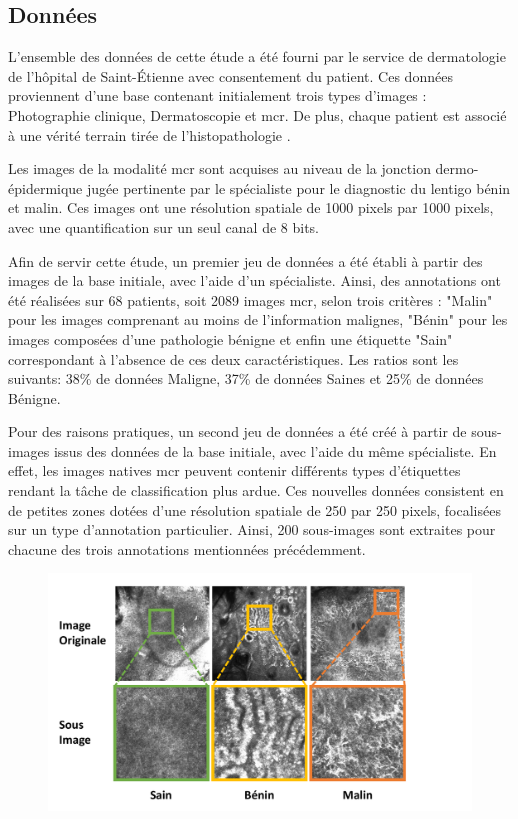 \documentclass{gretsi}
\begin{document}
\begin{sloppypar}
\subsection{Données}
L'ensemble des données de cette étude a été fourni par le service de dermatologie de l'hôpital de Saint-Étienne avec consentement du patient. Ces données proviennent d'une base contenant initialement trois types d’images : Photographie clinique, Dermatoscopie et \ac{mcr}. De plus, chaque patient est associé à une vérité terrain tirée de l’histopathologie \cite{Cinotti2018}.\par
Les images de la modalité \ac{mcr} sont acquises au niveau de la jonction dermo-épidermique jugée pertinente par le spécialiste pour le diagnostic du lentigo bénin et malin. Ces images ont une résolution spatiale de 1000 pixels par 1000 pixels, avec une quantification sur un seul canal de 8 bits.\par
Afin de servir cette étude, un premier jeu de données a été établi à partir des images de la base initiale, avec l’aide d’un spécialiste. Ainsi, des annotations ont été réalisées sur 68 patients, soit 2089 images \ac{mcr}, selon trois critères : "Malin" pour les images comprenant au moins de l'information malignes, "Bénin" pour les images composées d'une pathologie bénigne et enfin une étiquette "Sain" correspondant à l'absence de ces deux caractéristiques. Les ratios sont les suivants: 38\% de données Maligne, 37\% de données Saines et 25\% de données Bénigne.\par
Pour des raisons pratiques, un second jeu de données a été créé à partir de sous-images issus des données de la base initiale, avec l'aide du même spécialiste. En effet, les images natives \ac{mcr} peuvent contenir différents types d'étiquettes rendant la tâche de classification plus ardue. Ces nouvelles données consistent en de petites zones dotées d'une résolution spatiale de 250 par 250 pixels, focalisées sur un type d'annotation particulier. Ainsi, 200 sous-images sont extraites pour chacune des trois annotations mentionnées précédemment.\par
\begin{figure}[h]
    \begin{center} 
        \includegraphics[width=0.9\linewidth]{content/figures/Donnees.pdf}
        \label{donnees}
    \end{center} 
\end{figure}


\end{sloppypar}
\end{document}
